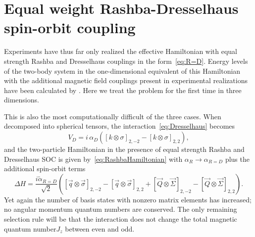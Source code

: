 \documentclass[%
 notitlepage,
 preprint,
showpacs,%
 amsmath,amssymb,
 aps,
pra,
]{revtex4-1}
\begin{document}
\section{\label{sec:R=D} Equal weight Rashba-Dresselhaus spin-orbit coupling}

Experiments have thus far only realized the effective Hamiltonian with equal strength Rashba and Dresselhaus couplings in the form~\eqref{eq:R=D}. Energy levels of the two-body system in the one-dimensional equivalent of this Hamiltonian with the additional magnetic field couplings present in experimental realizations have been calculated by \cite{guan2014energy}. Here we treat the problem for the first time in three dimensions.

This is also the most computationally difficult of the three cases. When decomposed into spherical tensors, the interaction~\eqref{eq:Dresselhaus} becomes
\begin{equation}
V_D=i\,\alpha_D \left( \left[ k \otimes \sigma \right]_{2,-2}- \left[ k \otimes \sigma \right]_{2,2}\right),
\end{equation}
and the two-particle Hamiltonian in the presence of equal strength Rashba and Dresselhaus SOC is given by~\eqref{eq:RashbaHamiltonian} with $\alpha_R\rightarrow \alpha_{R=D}$ plus the additional spin-orbit terms
\begin{equation}\label{eq:DresselhausHamiltonian}
\Delta H= \frac{i \tilde{\alpha}_{R=D}}{\sqrt{2}}\left(  \left[ \vec{q} \otimes \vec{\sigma} \right]_{2,-2} -  \left[ \vec{q} \otimes \vec{\sigma} \right]_{2,2} +[ \vec{Q} \otimes \vec{\Sigma} ]_{2,-2} -  [ \vec{Q} \otimes \vec{\Sigma} ]_{2,2} \right).
\end{equation} 
Yet again the number of basis states with nonzero matrix elements has increased; no angular momentum quantum numbers are conserved. The only remaining selection rule will be that the interaction does not change the total magnetic quantum number$J_z$ between even and odd. 
\end{document}

